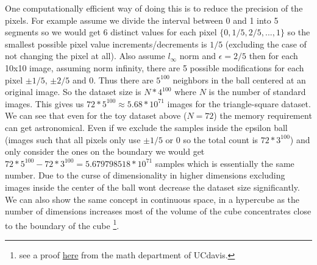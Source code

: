 \documentclass[../thesis.tex]{subfiles}
\begin{document}
	\label{ds_size_numeric_cals}
	One computationally efficient way of doing this is to reduce the precision of the pixels. For example assume we divide the interval between 0 and 1 into 5 segments so we would get 6 distinct values for each pixel $\{0, 1/5, 2/5, ..., 1\}$ so the smallest possible pixel value increments/decrements is $1/5$ (excluding the case of not changing the pixel at all). Also assume $l_{\infty}$ norm and $\epsilon = 2/5$ then for each 10x10 image, assuming norm infinity,  there are 5 possible modifications for each pixel $\pm 1/5$, $\pm 2/5$ and $0$. Thus there are $5^{100}$ neighbors in the ball centered at an original image. So the dataset size is $N * 4^{100}$ where $N$ is the number of standard images. This gives us $72* 5^{100} \approx 5.68*10^{71}$ images for the triangle-square dataset. We can see that even for the toy dataset above ($N=72$) the memory requirement can get astronomical. Even if we exclude the samples inside the epsilon ball (images such that all pixels only use $\pm 1/5$ or 0 so the total count is $72* 3^{100}$) and only consider the ones on the boundary we would get $72* 5^{100} - 72* 3^{100} = 5.679798518*10^{71}$ samples which is essentially the same number. Due to the curse of dimensionality in higher dimensions excluding images inside the center of the ball wont decrease the dataset size significantly. We can also show the same concept in continuous space, in a hypercube as the number of dimensions increases most of the volume of the cube concentrates close to the boundary of the cube \footnote{see a proof \href{https://github.com/lions-epfl-students/factors_adversarial_examples/blob/main/high_dimentional_volume.pdf}{here} from the math department of UCdavis.}.
	
	
\end{document}
